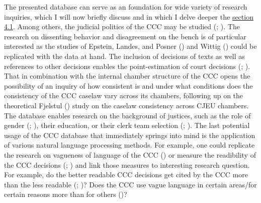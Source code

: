 \documentclass[
  11pt,
]{article}
\begin{document}
The presented database can serve as an foundation for wide variety of research inquiries, which I will now briefly discuss and in which I delve deeper the \hyperref[capacity]{section 4.1}. Among others, the judicial politics of the CCC may be studied (; ). The research on dissenting behavior and disagreement on the bench is of particular interested as the studies of Epstein, Landes, and Posner () and Wittig () could be replicated with the data at hand. The inclusion of decisions of texts as well as references to other decisions enables the point-estimation of court decisions (; ). That in combination with the internal chamber structure of the CCC opens the possibility of an inquiry of how consistent is and under what conditions does the consistency of the CCC caselaw vary across its chambers, following up on the theoretical Fjelstul () study on the caselaw consistency across CJEU chambers. The database enables research on the background of justices, such as the role of gender (; ), their education, or their clerk team selection (; ). The last potential usage of the CCC database that immediately springs into mind is the application of various natural language processing methods. For example, one could replicate the research on vagueness of language of the CCC () or measure the readibility of the CCC decisions (; ) and link those measures to interesting research question. For example, do the better readable CCC decisions get cited by the CCC more than the less readable (; )? Does the CCC use vague language in certain areas/for certain reasons more than for others ()?
\end{document}

